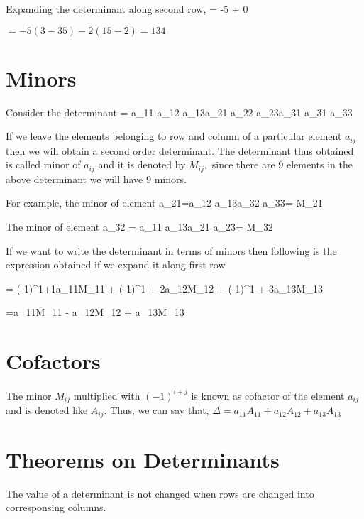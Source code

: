 Expanding the determinant along second row, \startformula \Delta = -5\startdeterminant{} \NR{} \NR\stopdeterminant + 0\startdeterminant{}  \NR{}\startdeterminant{} \NR{} \NR\stopdeterminant\stopformula

$= -5(3 - 35) -2(15 -2) = 134$

\section{Minors}
Consider the determinant \startformula \Delta = \startdeterminant\NC a_{11} \NC a_{12} \NC a_{13}\NR\NC a_{21} \NC a_{22} \NC a_{23}\NR\NC a_{31} \NC a_{31} \NC
  a_{33}\NR\stopdeterminant\stopformula

If we leave the elements belonging to row and column of a particular element $a_{ij}$ then we will obtain a second order
determinant. The determinant thus obtained is called minor of $a_{ij}$ and it is denoted by $M_{ij},$ since there are $9$ elements
in the above determinant we will have $9$ minors.

For example, the minor of element \startformula a_{21}=\startdeterminant\NC a_{12} \NC a_{13}\NR\NC a_{32} \NC a_{33}\NR\stopdeterminant = M_{21}\stopformula

The minor of element \startformula a_{32} = \startdeterminant\NC a_{11} \NC a_{13}\NR\NC a_{21} \NC a_{23}\NR\stopdeterminant = M_{32}\stopformula

If we want to write the determinant in terms of minors then following is the expression obtained if we expand it along first row

\startformula \Delta = (-1)^{1+1}a_{11}M_{11} + (-1)^{1 + 2}a_{12}M_{12} + (-1)^{1 + 3}a_{13}M_{13}\stopformula

\startformula =a_{11}M_{11} - a_{12}M_{12} + a_{13}M_{13}\stopformula

\section{Cofactors}
The minor $M_{ij}$ multiplied with $(-1)^{i+j}$ is known as cofactor of the element $a_{ij}$ and is denoted like $A_{ij}$. Thus, we
can say that, $\Delta = a_{11}A_{11} + a_{12}A_{12} + a_{13}A_{13}$

\section{Theorems on Determinants}
\starttheorem
  The value of a determinant is not changed when rows are changed into corresponsing columns.
\stoptheorem

